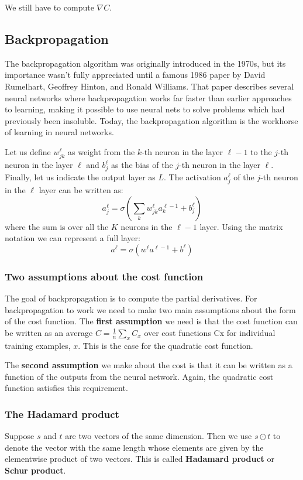 \documentclass[12pt, letterpaper]{article}
\theoremstyle{definition}
\let\tb\textbf
\begin{document}
We still have to compute $\nabla C$.

\subsection{Backpropagation}
The backpropagation algorithm was originally introduced in the 1970s, but its importance wasn't fully appreciated until a famous 1986 paper by David Rumelhart, Geoffrey Hinton, and Ronald Williams. That paper describes several neural networks where backpropagation works far faster than earlier approaches to learning, making it possible to use neural nets to solve problems which had previously been insoluble. Today, the backpropagation algorithm is the workhorse of learning in neural networks.

Let us define $w_{jk}^{\ell}$ as weight from the $k$-th neuron in the layer $\ell-1$ to the $j$-th neuron in the layer $\ell$ and $b^\ell_j$ as the bias of the $j$-th neuron in the layer $\ell$. Finally, let us indicate the output layer as $L$. The activation $a_j^\ell$ of the $j$-th neuron in the $\ell$ layer can be written as:
\begin{equation}
a_j^\ell = \sigma \left(\sum_k w_{jk}^\ell a_k^{\ell-1} + b_j^\ell\right)
\end{equation}
where the sum is over all the $K$ neurons in the $\ell-1$ layer. Using the matrix notation we can represent a full layer:
\begin{equation}
a^\ell = \sigma \left( w^\ell a^{\ell-1} +b^\ell\right)
\end{equation}
\subsubsection{Two assumptions about the cost function}
The goal of backpropagation is to compute the partial derivatives. For backpropagation to work we need to make two main assumptions about the form of the cost function. 
The \tb{first assumption} we need is that the cost function can be written as an average $C=\frac{1}{n}\sum_x C_x$ over cost functions Cx for individual training examples, $x$. This is the case for the quadratic cost function.

The \tb{second assumption} we make about the cost is that it can be written as a function of the outputs from the neural network. Again, the quadratic cost function satisfies this requirement.
\subsubsection{The Hadamard product}
Suppose $s$ and $t$ are two vectors of the same dimension. Then we use $s\odot t$ to denote the vector with the same length whose elements are given by the elementwise product of two vectors.
This is called \tb{Hadamard product} or \tb{Schur product}.
\end{document}
